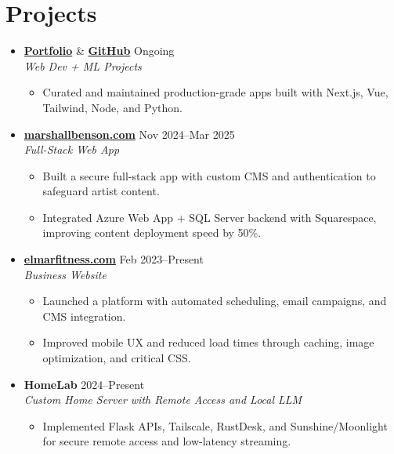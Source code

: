 \documentclass[letterpaper,10pt]{article}
\newcommand{\resumeItem}[1]{\item \small{#1}}
\begin{document}
\section*{Projects}
\begin{itemize}
  \item[]
    \textbf{\href{https://mig.is-a.dev}{Portfolio}} \& \textbf{\href{https://github.com/miguelaram2016}{GitHub}} \hfill Ongoing \\
    \textit{Web Dev + ML Projects}
    \begin{itemize}[leftmargin=0.15in]
      \resumeItem{Curated and maintained production-grade apps built with Next.js, Vue, Tailwind, Node, and Python.}
    \end{itemize}

  \item[]
    \textbf{\href{https://marshallbenson.com}{marshallbenson.com}} \hfill Nov 2024–Mar 2025 \\
    \textit{Full-Stack Web App}
    \begin{itemize}[leftmargin=0.15in]
      \resumeItem{Built a secure full-stack app with custom CMS and authentication to safeguard artist content.}
      \resumeItem{Integrated Azure Web App + SQL Server backend with Squarespace, improving content deployment speed by 50\%.}
    \end{itemize}

  \item[]
    \textbf{\href{https://elmarfitness.com}{elmarfitness.com}} \hfill Feb 2023–Present \\
    \textit{Business Website}
    \begin{itemize}[leftmargin=0.15in]
      \resumeItem{Launched a platform with automated scheduling, email campaigns, and CMS integration.}
      \resumeItem{Improved mobile UX and reduced load times through caching, image optimization, and critical CSS.}
    \end{itemize}

  \item[]
    \textbf{HomeLab} \hfill 2024–Present \\
    \textit{Custom Home Server with Remote Access and Local LLM}
    \begin{itemize}[leftmargin=0.15in]
      \resumeItem{Implemented Flask APIs, Tailscale, RustDesk, and Sunshine/Moonlight for secure remote access and low-latency streaming.}
    \end{itemize}
\end{itemize}
\end{document}
